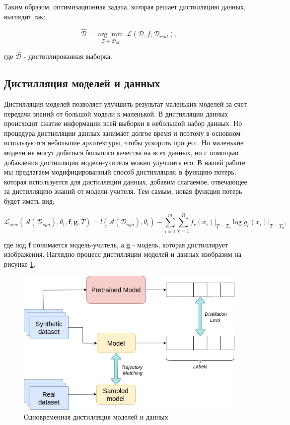 \documentclass[12pt]{article}
\begin{document}
Таким образом, оптимизационная задача, которая решает дистилляцию данных, выглядит так:
        
\begin{equation}\label{eq3}
    \mathcal{\hat D} = \underset{\mathcal{D} \in \mathcal{D}_M}{\arg\min}~ \mathcal{L}(\mathcal{D}, f, \mathcal{D}_{real}),
\end{equation}


где $\mathcal{\hat D}$ - дистиллированная выборка.



\subsection{Дистилляция моделей и данных}

Дистилляция моделей позволяет улучшить результат маленьких моделей за счет передачи знаний от большой модели к маленькой. В дистилляции данных происходит сжатие информации всей выборки в небольшой набор данных. 
Но процедура дистилляции данных занимает долгое время и поэтому в основном используются небольшие архитектуры, чтобы ускорить процесс. Но маленькие модели не могут добиться большого качества на всех данных, но с помощью добавления дистилляции модели-учителя можно улучшить его.  В нашей работе мы предлагаем модифицированный способ дистилляции: в функцию потерь, которая используется для дистилляции данных, добавим слагаемое, отвечающее за дистилляцию знаний от модели-учителя. Тем самым, новая функция потерь будет иметь вид: 


\begin{equation}\label{eq4}
    \mathcal{L}_{new}(\mathcal{A}(\mathcal{D}_{syn}), \theta_t, \mathbf{f}, \mathbf{g}, T) = l(\mathcal{A}(\mathcal{D}_{syn}), \theta_t) - \sum\limits_{i=1}^{m}\sum\limits_{r=1}^{R}f_{r}(x_{i})\bigr|_{T=T_{0} }\log{g_{r}(x_{i})}\bigr|_{T=T_{0}},    
\end{equation}

где под $\mathbf{f}$ понимается модель-учитель, а $\mathbf{g}$ - модель, которая дистиллирует изображения. Наглядно процесс дистилляции моделей и данных изобразим на рисунке \ref{ris}.

    \begin{figure}[h!]
            \centering
            \includegraphics[width=0.5\linewidth]
            {dist.jpg}
            \caption{Одновременная дистилляция моделей и данных}
            \label{ris}
    \end{figure}
\end{document}
